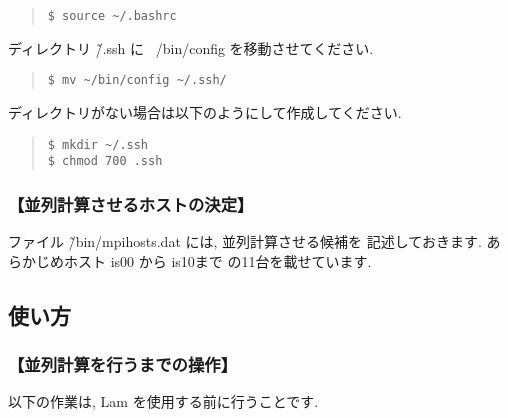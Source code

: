 \documentclass[a4paper,titlepage]{jreport}
\begin{document}
\begin{quote}
\begin{screen}
\begin{verbatim}
$ source ~/.bashrc
\end{verbatim}
\end{screen}
\end{quote}

ディレクトリ \~/.ssh に ~/bin/config を移動させてください.

\begin{quote}
\begin{screen}
\begin{verbatim}
$ mv ~/bin/config ~/.ssh/
\end{verbatim}
\end{screen}
\end{quote}

ディレクトリがない場合は以下のようにして作成してください.

\begin{quote}
\begin{screen}
\begin{verbatim}
$ mkdir ~/.ssh
$ chmod 700 .ssh
\end{verbatim}
\end{screen}
\end{quote}

\subsubsection{【並列計算させるホストの決定】}
ファイル \~/bin/mpihosts.dat には, 並列計算させる候補を
記述しておきます. あらかじめホスト is00 から is10まで
の11台を載せています.

\subsection{使い方}

\subsubsection{【並列計算を行うまでの操作】}
以下の作業は, Lam を使用する前に行うことです.
\end{document}
